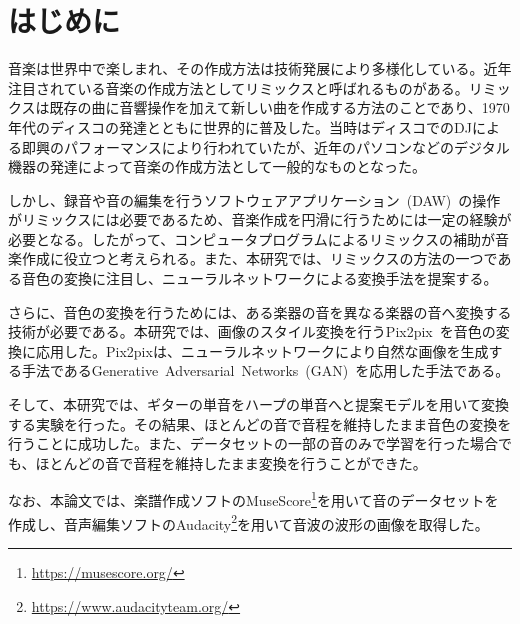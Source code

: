 \chapter{はじめに}

音楽は世界中で楽しまれ、その作成方法は技術発展により多様化している。近年注目されている音楽の作成方法としてリミックスと呼ばれるものがある。リミックスは既存の曲に音響操作を加えて新しい曲を作成する方法のことであり、1970年代のディスコの発達とともに世界的に普及した。当時はディスコでのDJによる即興のパフォーマンスにより行われていたが、近年のパソコンなどのデジタル機器の発達によって音楽の作成方法として一般的なものとなった。

しかし、録音や音の編集を行うソフトウェアアプリケーション~(DAW)~の操作がリミックスには必要であるため、音楽作成を円滑に行うためには一定の経験が必要となる。したがって、コンピュータプログラムによるリミックスの補助が音楽作成に役立つと考えられる。また、本研究では、リミックスの方法の一つである音色の変換に注目し、ニューラルネットワークによる変換手法を提案する。

さらに、音色の変換を行うためには、ある楽器の音を異なる楽器の音へ変換する技術が必要である。本研究では、画像のスタイル変換を行うPix2pix~\cite{pix2pix}を音色の変換に応用した。Pix2pixは、ニューラルネットワークにより自然な画像を生成する手法であるGenerative~Adversarial~Networks~(GAN)~\cite{GAN}を応用した手法である。

そして、本研究では、ギターの単音をハープの単音へと提案モデルを用いて変換する実験を行った。その結果、ほとんどの音で音程を維持したまま音色の変換を行うことに成功した。また、データセットの一部の音のみで学習を行った場合でも、ほとんどの音で音程を維持したまま変換を行うことができた。

なお、本論文では、楽譜作成ソフトのMuseScore\footnote{\url{https://musescore.org/}}を用いて音のデータセットを作成し、音声編集ソフトのAudacity\footnote{\url{https://www.audacityteam.org/}}を用いて音波の波形の画像を取得した。